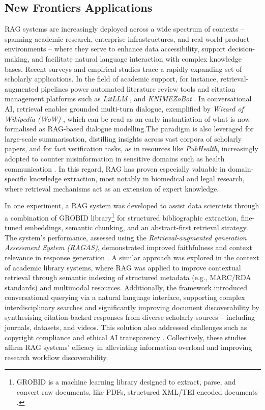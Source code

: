 \begin{spacing}{1.5}
\section{New Frontiers Applications}\label{sec:evol_qas}
RAG systems are increasingly deployed across a wide spectrum of contexts -- spanning academic research, enterprise infrastructures, and real-world product environments -- where they serve to enhance data accessibility, support decision-making, and facilitate natural language interaction with complex knowledge bases. Recent surveys and empirical studies trace a rapidly expanding set of scholarly applications. In the field of academic support, for instance, retrieval-augmented pipelines power automated literature review tools and citation management platforms such as \textit{LitLLM} \citep{agarwal_litllm_2025}, and \textit{KNIMEZoBot} \citep{alshammari_knimezobot_2023}. In conversational AI, retrieval enables grounded multi-turn dialogue, exemplified by \textit{Wizard of Wikipedia (WoW)} \citep{dinan_wizard_2019}, which can be read as an early instantiation of what is now formalised as RAG-based dialogue modelling.The paradigm is also leveraged for large-scale summarisation, distilling insights across vast corpora of scholarly papers, and for fact verification tasks, as in resources like \textit{PubHealth}, increasingly adopted to counter misinformation in sensitive domains such as health communication \citep{kotonya_explainable_2020}. In this regard, RAG has proven especially valuable in domain-specific knowledge extraction, most notably in biomedical and legal research, where retrieval mechanisms act as an extension of expert knowledge.


In one experiment, a RAG system was developed to assist data scientists through a combination of GROBID library\footnote{GROBID is a machine learning library designed to extract, parse, and convert raw documents, like PDFs, structured XML/TEI encoded documents \citep{GROBID}.} for structured bibliographic extraction, fine-tuned embeddings, semantic chunking, and an abstract-first retrieval strategy. The system's performance, assessed using the \textit{Retrieval-augmented generation Assessment System (RAGAS)}, demonstrated improved faithfulness and context relevance in response generation \citep{aytar_retrieval-augmented_2024}. A similar approach was explored in the context of academic library systems, where RAG was applied to improve contextual retrieval through semantic indexing of structured metadata (e.g., MARC/RDA standards) and multimodal resources. Additionally, the framework introduced conversational querying via a natural language interface, supporting complex interdisciplinary searches and significantly improving document discoverability by synthesising citation-backed responses from diverse scholarly sources -- including journals, datasets, and videos. This solution also addressed challenges such as copyright compliance and ethical AI transparency \citep{bevara_prospects_2025}.  Collectively, these studies affirm RAG systems’ efficacy in alleviating information overload and improving research workflow discoverability.


\end{spacing}
